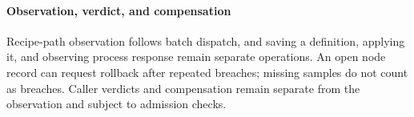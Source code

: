 \paragraph{Observation, verdict, and compensation}
Recipe-path observation follows batch dispatch, and saving a definition,
applying it, and observing process response remain separate operations. An
open node record can request rollback after repeated breaches; missing samples
do not count as breaches. Caller verdicts and compensation remain separate
from the observation and subject to admission checks.
\label{sec:agentloop}
